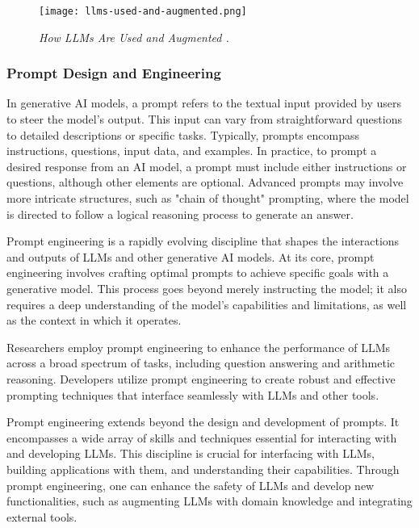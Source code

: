 \begin{figure}[H]
    \centering
    \texttt{[image: llms-used-and-augmented.png]}
    \caption{
        \it{How LLMs Are Used and Augmented \cite{minaee2024large}.}
    }
    \label{fig:llm-used-and-augmented}
\end{figure}

\subsubsection*{Prompt Design and Engineering}

In generative AI models, a prompt refers to the textual input provided by users to steer the model's output. This input can vary from straightforward questions to detailed descriptions or specific tasks. Typically, prompts encompass instructions, questions, input data, and examples. In practice, to prompt a desired response from an AI model, a prompt must include either instructions or questions, although other elements are optional. Advanced prompts may involve more intricate structures, such as "chain of thought" prompting, where the model is directed to follow a logical reasoning process to generate an answer.

Prompt engineering is a rapidly evolving discipline that shapes the interactions and outputs of LLMs and other generative AI models. At its core, prompt engineering involves crafting optimal prompts to achieve specific goals with a generative model. This process goes beyond merely instructing the model; it also requires a deep understanding of the model's capabilities and limitations, as well as the context in which it operates.

Researchers employ prompt engineering to enhance the performance of LLMs across a broad spectrum of tasks, including question answering and arithmetic reasoning. Developers utilize prompt engineering to create robust and effective prompting techniques that interface seamlessly with LLMs and other tools.

Prompt engineering extends beyond the design and development of prompts. It encompasses a wide array of skills and techniques essential for interacting with and developing LLMs. This discipline is crucial for interfacing with LLMs, building applications with them, and understanding their capabilities. Through prompt engineering, one can enhance the safety of LLMs and develop new functionalities, such as augmenting LLMs with domain knowledge and integrating external tools.

